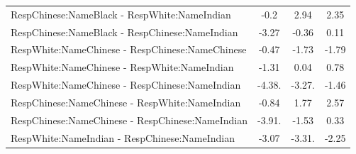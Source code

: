 \documentclass[]{report}
\begin{document}
\begin{table}
{\begin{tabular}[t]{lccc}
		RespChinese:NameBlack - RespWhite:NameIndian & -0.2 & 2.94 & 2.35 \\ 
		RespChinese:NameBlack - RespChinese:NameIndian & -3.27 & -0.36 & 0.11 \\ 
		RespWhite:NameChinese - RespChinese:NameChinese & -0.47 & -1.73 & -1.79 \\ 
		RespWhite:NameChinese - RespWhite:NameIndian & -1.31 & 0.04 & 0.78 \\ 
		RespWhite:NameChinese - RespChinese:NameIndian & -4.38. & -3.27. & -1.46 \\ 
		RespChinese:NameChinese - RespWhite:NameIndian & -0.84 & 1.77 & 2.57 \\ 
		RespChinese:NameChinese - RespChinese:NameIndian & -3.91. & -1.53 & 0.33 \\ 
		RespWhite:NameIndian - RespChinese:NameIndian & -3.07 & -3.31. & -2.25 \\ 
		\bottomrule
	\end{tabular}}
\end{table}
\end{document}
